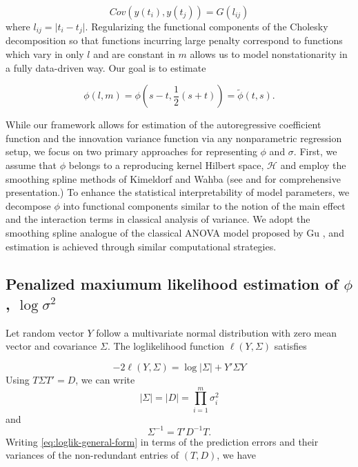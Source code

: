 \begin{equation*}
Cov\left(y\left( t_i \right),y\left( t_j \right)\right) = G\left( l_{ij}  \right)
\end{equation*}
\noindent
where $l_{ij} =  \vert  t_i - t_j  \vert $. Regularizing the functional components of the Cholesky decomposition so that functions incurring large penalty correspond to functions which vary in only $l$ and are constant in $m$ allows us to model nonstationarity in a fully data-driven way.  Our goal is to estimate

\begin{equation} 
\phi\left(l,m\right) = \phi\left(s-t, \frac{1}{2}\left(s+t\right)\right) = \tilde{\phi}\left(t,s\right).
\end{equation}

\bigskip

While our framework allows for estimation of the autoregressive coefficient function and the innovation variance function via any nonparametric regression setup, we focus on two primary approaches for representing $\phi$ and $\sigma$. First, we assume that $\phi$ belongs to a reproducing kernel Hilbert space, $\mathcal{H}$ and employ the smoothing spline methods of Kimeldorf and Wahba (see \cite{kimeldorf1971some} and \cite{wahba1990spline} for comprehensive presentation.)  To enhance the statistical interpretability of model parameters, we decompose $\phi$ into functional components similar to the notion of the main effect and the interaction terms in classical analysis of variance. We adopt the smoothing spline analogue of the classical ANOVA model proposed by Gu \cite{gu2013smoothing}, and estimation is achieved through similar computational strategies.

\subsection{Penalized maxiumum likelihood estimation of $\phi$, $\log\sigma^2$}

Let random vector $Y$ follow a multivariate normal distribution with zero mean vector and covariance $\Sigma$. The loglikelihood function $\ell \left( Y, \Sigma \right)$ satisfies

\begin{equation} \label{eq:loglik-general-form}
-2\ell\left( Y, \Sigma \right) = \log \vert \Sigma \vert + Y' \Sigma Y
\end{equation}
\noindent
Using $T \Sigma T' = D$, we can write 
\[
\vert \Sigma\vert = \vert D \vert = \prod_{i = 1}^m \sigma_i^2
\]
and 
\[
\Sigma^{-1} = T' D^{-1} T.
\]
Writing \ref{eq:loglik-general-form} in terms of the prediction errors and their variances of the non-redundant entries of $\left(T , D\right)$, we have

